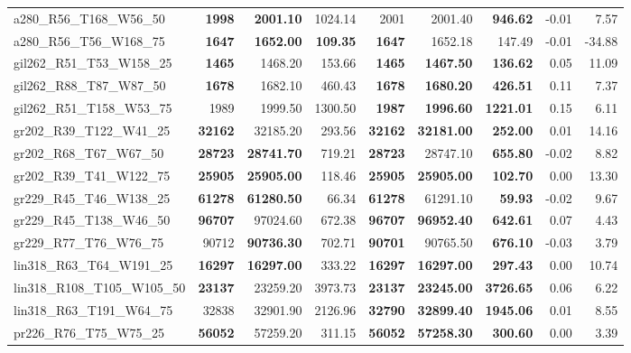 \documentclass{singlecol-new}
\begin{document}
\begin{scriptsize}
\begin{longtable}{lrrrrrrrr}
		a280\_R56\_T168\_W56\_50 & \textbf{1998} & \textbf{2001.10} & 1024.14 & 2001 & 2001.40 & \textbf{946.62} & -0.01 & 7.57 \\
		a280\_R56\_T56\_W168\_75 & \textbf{1647} & \textbf{1652.00} & \textbf{109.35} & \textbf{1647} & 1652.18 & 147.49 & -0.01 & -34.88 \\
		gil262\_R51\_T53\_W158\_25 & \textbf{1465} & 1468.20 & 153.66 & \textbf{1465} & \textbf{1467.50} & \textbf{136.62} & 0.05 & 11.09 \\
		gil262\_R88\_T87\_W87\_50 & \textbf{1678} & 1682.10 & 460.43 & \textbf{1678} & \textbf{1680.20} & \textbf{426.51} & 0.11 & 7.37 \\
		gil262\_R51\_T158\_W53\_75 & 1989 & 1999.50 & 1300.50 & \textbf{1987} & \textbf{1996.60} & \textbf{1221.01} & 0.15 & 6.11 \\
		gr202\_R39\_T122\_W41\_25 & \textbf{32162} & 32185.20 & 293.56 & \textbf{32162} & \textbf{32181.00} & \textbf{252.00} & 0.01 & 14.16 \\
		gr202\_R68\_T67\_W67\_50 & \textbf{28723} & \textbf{28741.70} & 719.21 & \textbf{28723} & 28747.10 & \textbf{655.80} & -0.02 & 8.82 \\
		gr202\_R39\_T41\_W122\_75 & \textbf{25905} & \textbf{25905.00} & 118.46 & \textbf{25905} & \textbf{25905.00} & \textbf{102.70} & 0.00 & 13.30 \\
		gr229\_R45\_T46\_W138\_25 & \textbf{61278} & \textbf{61280.50} & 66.34 & \textbf{61278} & 61291.10 & \textbf{59.93} & -0.02 & 9.67 \\
		gr229\_R45\_T138\_W46\_50 & \textbf{96707} & 97024.60 & 672.38 & \textbf{96707} & \textbf{96952.40} & \textbf{642.61} & 0.07 & 4.43 \\
		gr229\_R77\_T76\_W76\_75 & 90712 & \textbf{90736.30} & 702.71 & \textbf{90701} & 90765.50 & \textbf{676.10} & -0.03 & 3.79 \\
		lin318\_R63\_T64\_W191\_25 & \textbf{16297} & \textbf{16297.00} & 333.22 & \textbf{16297} & \textbf{16297.00} & \textbf{297.43} & 0.00 & 10.74 \\
		lin318\_R108\_T105\_W105\_50 & \textbf{23137} & 23259.20 & 3973.73 & \textbf{23137} & \textbf{23245.00} & \textbf{3726.65} & 0.06 & 6.22 \\
		lin318\_R63\_T191\_W64\_75 & 32838 & 32901.90 & 2126.96 & \textbf{32790} & \textbf{32899.40} & \textbf{1945.06} & 0.01 & 8.55 \\
		pr226\_R76\_T75\_W75\_25 & \textbf{56052} & 57259.20 & 311.15 & \textbf{56052} & \textbf{57258.30} & \textbf{300.60} & 0.00 & 3.39 \\

\end{longtable}
\end{scriptsize}
\end{document}
